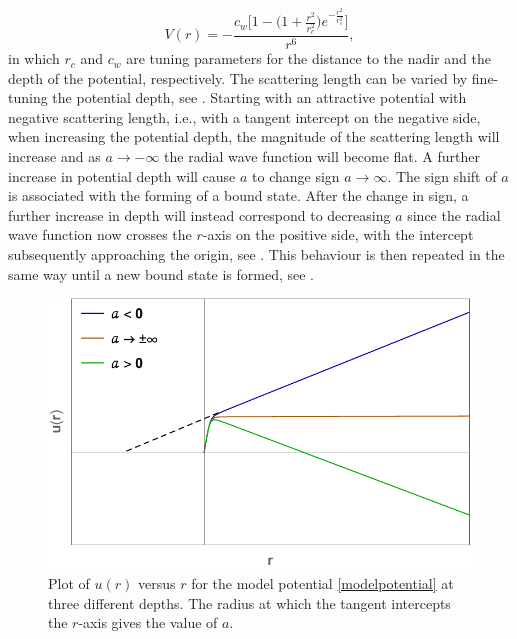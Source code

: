 \begin{equation}\label{modelpotential}
V(r) = -\frac{c_w\bigg[1-\Big(1 + \frac{r^2}{r_c^2}\Big)e^{-\frac{r^2}{r_c^2}}\bigg]}{r^6},
\end{equation}
in which $r_c$ and $c_w$ are tuning parameters for the distance to the nadir and the depth of the potential, respectively. The scattering length can be varied by fine-tuning the potential depth, see . Starting with an attractive potential with negative scattering length, i.e., with a tangent intercept on the negative side, when increasing the potential depth, the magnitude of the scattering length will increase and as $a \rightarrow -\infty$ the radial wave function will become flat. A further increase in potential depth will cause $a$ to change sign $a \rightarrow \infty$. The sign shift of $a$ is associated with the forming of a bound state. After the change in sign, a further increase in depth will instead correspond to decreasing $a$ since the radial wave function now crosses the $r$-axis on the positive side, with the intercept subsequently approaching the origin, see . This behaviour is then repeated in the same way until a new bound state is formed, see .

\begin{figure}
	\includegraphics[width=\linewidth]{intercept.pdf}
	\caption{Plot of $u(r)$ versus $r$ for the model potential \eqref{modelpotential} at three different depths. The radius at which the tangent intercepts the $r$-axis gives the value of $a$.}
	\label{fig:intercept}
\end{figure}

